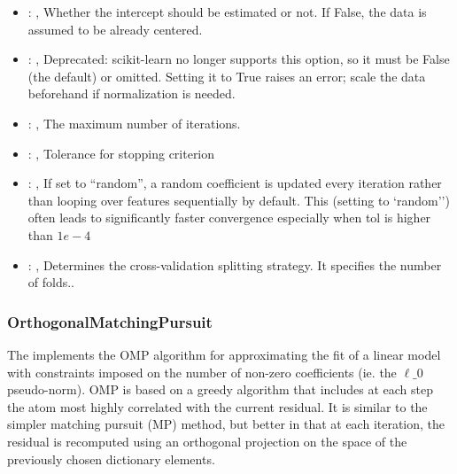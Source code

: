 \begin{itemize}
    \item {}: ,
      Whether the intercept should be estimated or not. If False,
      the data is assumed to be already centered.

    \item {}: ,
      Deprecated: scikit-learn no longer supports this option, so it must be False (the default) or
      omitted.                                                  Setting it to True raises an error;
      scale the data beforehand if normalization is needed.

    \item {}: ,
      The maximum number of iterations.

    \item {}: ,
      Tolerance for stopping criterion

    \item {}: ,
      If set to ``random'', a random coefficient is updated every iteration
      rather than looping over features sequentially by default. This (setting to `random'')
      often leads to significantly faster convergence especially when tol is higher than $1e-4$

    \item {}: ,
      Determines the cross-validation splitting strategy.
      It specifies the number of folds..
  \end{itemize}


\subsubsection{OrthogonalMatchingPursuit}
  The                          implements the OMP algorithm for
  approximating the fit of a                         linear model with constraints imposed on the
  number of non-zero                         coefficients (ie. the $\ell\_0$ pseudo-norm). OMP is
  based on a greedy                         algorithm that includes at each step the atom most
  highly correlated                         with the current residual. It is similar to the simpler
  matching                         pursuit (MP) method, but better in that at each iteration, the
  residual                         is recomputed using an orthogonal projection on the space of the
  previously chosen dictionary elements.

